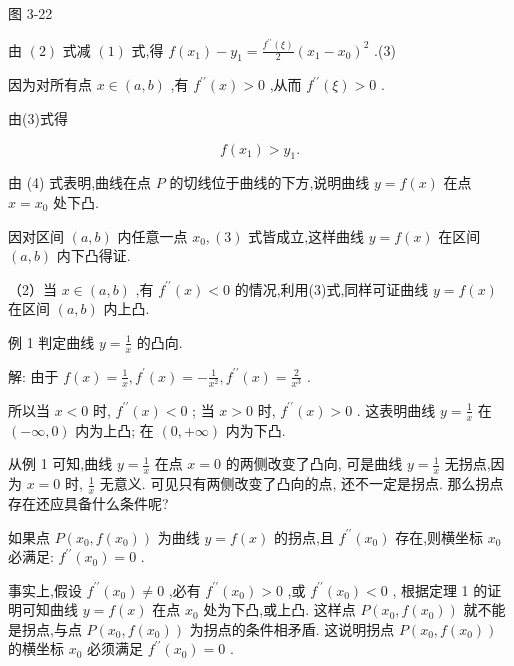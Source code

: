\documentclass[lang=cn,newtx,10pt,scheme=chinese]{elegantbook}
\begin{document}
图 3-22

由 \(\left( 2\right)\) 式减 \(\left( 1\right)\) 式,得 \(f\left( {x}_{1}\right) - {y}_{1} = \frac{{f}^{\prime \prime }\left( \xi \right) }{2}{\left( {x}_{1} - {x}_{0}\right) }^{2}\) .(3)

因为对所有点 \(x \in \left( {a,b}\right)\) ,有 \({f}^{\prime \prime }\left( x\right) > 0\) ,从而 \({f}^{\prime \prime }\left( \xi \right) > 0\) .

由(3)式得

\[
f\left( {x}_{1}\right) > {y}_{1}\text{.} \tag{4}
\]

由 (4) 式表明,曲线在点 \(P\) 的切线位于曲线的下方,说明曲线 \(y = f\left( x\right)\) 在点 \(x = {x}_{0}\) 处下凸.

因对区间 \(\left( {a,b}\right)\) 内任意一点 \({x}_{0},\left( 3\right)\) 式皆成立,这样曲线 \(y = f\left( x\right)\) 在区间 \(\left( {a,b}\right)\) 内下凸得证.

（2）当 \(x \in \left( {a,b}\right)\) ,有 \({f}^{\prime \prime }\left( x\right) < 0\) 的情况,利用(3)式,同样可证曲线 \(y = f\left( x\right)\) 在区间 \(\left( {a,b}\right)\) 内上凸.

例 1 判定曲线 \(y = \frac{1}{x}\) 的凸向.

解: 由于 \(f\left( x\right) = \frac{1}{x},{f}^{\prime }\left( x\right) = - \frac{1}{{x}^{2}},{f}^{\prime \prime }\left( x\right) = \frac{2}{{x}^{3}}\) .

所以当 \(x < 0\) 时, \({f}^{\prime \prime }\left( x\right) < 0\) ; 当 \(x > 0\) 时, \({f}^{\prime \prime }\left( x\right) > 0\) . 这表明曲线 \(y = \frac{1}{x}\) 在 \(\left( {-\infty ,0}\right)\) 内为上凸; 在 \(\left( {0, + \infty }\right)\) 内为下凸.

从例 1 可知,曲线 \(y = \frac{1}{x}\) 在点 \(x = 0\) 的两侧改变了凸向, 可是曲线 \(y = \frac{1}{x}\) 无拐点,因为 \(x = 0\) 时, \(\frac{1}{x}\) 无意义. 可见只有两侧改变了凸向的点, 还不一定是拐点. 那么拐点存在还应具备什么条件呢?

如果点 \(P\left( {{x}_{0},f\left( {x}_{0}\right) }\right)\) 为曲线 \(y = f\left( x\right)\) 的拐点,且 \({f}^{\prime \prime }\left( {x}_{0}\right)\) 存在,则横坐标 \({x}_{0}\) 必满足: \({f}^{\prime \prime }\left( {x}_{0}\right) = 0\) .

事实上,假设 \({f}^{\prime \prime }\left( {x}_{0}\right) \neq 0\) ,必有 \({f}^{\prime \prime }\left( {x}_{0}\right) > 0\) ,或 \({f}^{\prime \prime }\left( {x}_{0}\right) < 0\) , 根据定理 1 的证明可知曲线 \(y = f\left( x\right)\) 在点 \({x}_{0}\) 处为下凸,或上凸. 这样点 \(P\left( {{x}_{0},f\left( {x}_{0}\right) }\right)\) 就不能是拐点,与点 \(P\left( {{x}_{0},f\left( {x}_{0}\right) }\right)\) 为拐点的条件相矛盾. 这说明拐点 \(P\left( {{x}_{0},f\left( {x}_{0}\right) }\right)\) 的横坐标 \({x}_{0}\) 必须满足 \({f}^{\prime \prime }\left( {x}_{0}\right) = 0\) .
\end{document}
